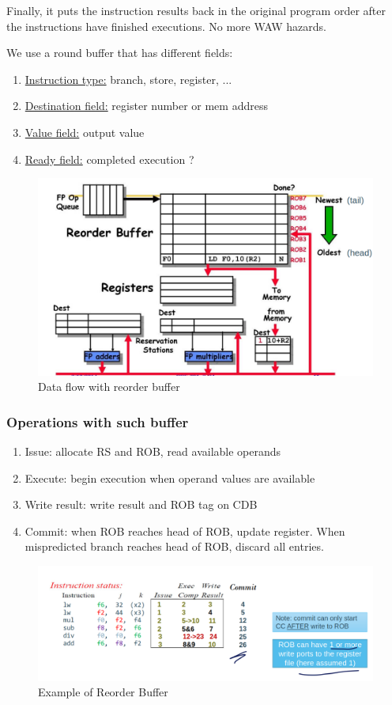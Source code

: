 \documentclass{report}
\begin{document}
Finally, it puts the instruction results back in the original program order after the instructions have finished executions. No more WAW hazards.

We use a round buffer that has different fields:

\begin{enumerate}
    \item \underline{Instruction type:} branch, store, register, ...
    \item \underline{Destination field:} register number or mem address
    \item \underline{Value field:} output value
    \item \underline{Ready field:} completed execution ?
\end{enumerate}

\begin{figure}[H]
    \centering
    \includegraphics[width=0.7\linewidth]{ROB_reorder.png}
    \caption{Data flow with reorder buffer}
    \label{fig:ROB-reorder-label}
\end{figure}

\subsubsection{Operations with such buffer}

\begin{enumerate}
    \item Issue: allocate RS and ROB, read available operands
    \item Execute: begin execution when operand values are available
    \item Write result: write result and ROB tag on CDB
    \item Commit: when ROB reaches head of ROB, update register. When mispredicted branch reaches head of ROB, discard all entries.
\end{enumerate}

\begin{figure}[H]
    \centering
    \includegraphics[width=0.75\linewidth]{example_ROB.png}
    \caption{Example of Reorder Buffer}
    \label{fig:enter-label}
\end{figure}
\end{document}
